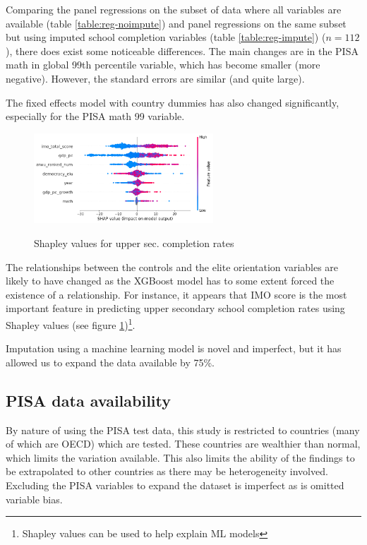 \documentclass[11pt]{article}
\begin{document}
Comparing the panel regressions on the subset of data where all variables are available (table \ref{table:reg-noimpute}) and panel regressions on the same subset but using imputed school completion variables (table \ref{table:reg-impute}) ($n=112$), there does exist some noticeable differences. The main changes are in the PISA math in global 99th percentile variable, which has become smaller (more negative). However, the standard errors are similar (and quite large).

The fixed effects model with country dummies has also changed significantly, especially for the PISA math 99 variable.

\begin{figure}[H]
    \caption{Shapley values for upper sec. completion rates}
    \centering
    \includegraphics[width=0.6\textwidth]{../shap_upper_sec.png}
    \label{fig:shap-upper-sec}
\end{figure}

The relationships between the controls and the elite orientation variables are likely to have changed as the XGBoost model has to some extent forced the existence of a relationship. For instance, it appears that IMO score is the most important feature in predicting upper secondary school completion rates using Shapley values (see figure \ref{fig:shap-upper-sec})\footnote{Shapley values can be used to help explain ML models}.

Imputation using a machine learning model is novel and imperfect, but it has allowed us to expand the data available by 75\%.

\subsection{PISA data availability}
By nature of using the PISA test data, this study is restricted to countries (many of which are OECD) which are tested. These countries are wealthier than normal, which limits the variation available. This also limits the ability of the findings to be extrapolated to other countries as there may be heterogeneity involved. Excluding the PISA variables to expand the dataset is imperfect as is omitted variable bias.
\end{document}
